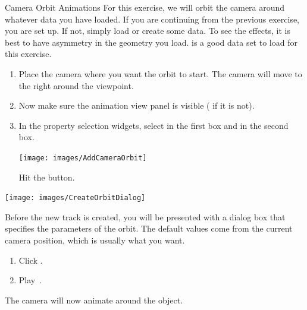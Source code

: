 \begin{exercise}{Camera Orbit Animations}
  \label{ex:CameraOrbitAnimations}%
  For this exercise, we will orbit the camera around whatever data you have
  loaded.  If you are continuing from the previous exercise, you are set
  up.  If not, simply load or create some data.  To see the effects, it is
  best to have asymmetry in the geometry you load.   is a good
  data set to load for this exercise.

  \begin{enumerate}
  \item Place the camera where you want the orbit to start.  The camera
    will move to the right around the viewpoint.
  \item Now make sure the animation view panel is visible ( \ra
     if it is not).
  \item In the property selection widgets, select  in the first
    box and  in the second box.
    \begin{inlinefig}
      \texttt{[image: images/AddCameraOrbit]}
    \end{inlinefig}
    Hit the  button.
    \savecounter
  \end{enumerate}

  \begin{inlinefig}
    \texttt{[image: images/CreateOrbitDialog]}
  \end{inlinefig}

  Before the new track is created, you will be presented with a dialog box
  that specifies the parameters of the orbit.  The default values come from
  the current camera position, which is usually what you want.

  \begin{enumerate}
    \restorecounter
  \item Click .
  \item Play~\vcrPlay.
  \end{enumerate}

  The camera will now animate around the object.
\end{exercise}


